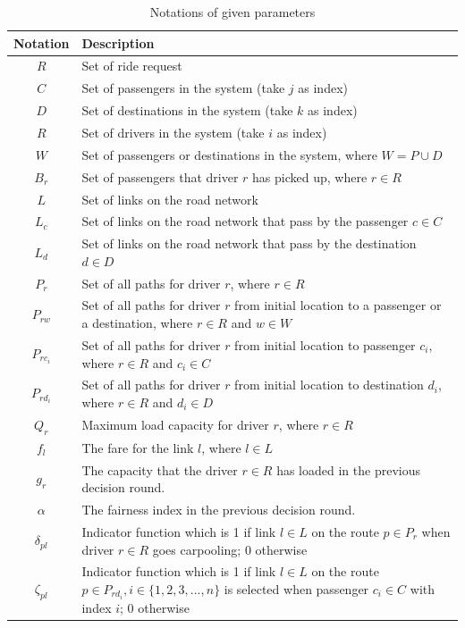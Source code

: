 \renewcommand\arraystretch{1.5}
\par
\begin{table}[ht]
  \centering
  \caption{Notations of given parameters}
  \begin{tabularx}{\textwidth}{cX}
  \toprule
  Notation & Description \\
  \midrule
    $R$ & Set of ride request \\
    $C$ & Set of passengers in the system (take $j$ as index) \\
    $D$ & Set of destinations in the system (take $k$ as index) \\
    $R$ & Set of drivers in the system (take $i$ as index) \\
    $W$ & Set of passengers or destinations in the system, where $W = P \cup D$ \\
    $B_r$ & Set of passengers that driver $r$ has picked up, where $r \in R$ \\
    $L$ & Set of links on the road network \\
    $L_c$ & Set of links on the road network that pass by the passenger $c \in C$ \\
    $L_d$ & Set of links on the road network that pass by the destination $d \in D$ \\
    $P_r$ & Set of all paths for driver $r$, where $r \in R$ \\
    $P_{rw}$ & Set of all paths for driver $r$ from initial location to a passenger or a destination, where $r \in R$ and $w \in W$ \\
    $P_{rc_i}$ & Set of all paths for driver $r$ from initial location to passenger $c_i$, where $r \in R$ and $c_i \in C$ \\
    $P_{rd_i}$ & Set of all paths for driver $r$ from initial location to destination $d_i$, where $r \in R$ and $d_i \in D$ \\
    $Q_r$ & Maximum load capacity for driver $r$, where $r \in R$ \\
    $f_l$ & The fare for the link $l$, where $l \in L$ \\
    $g_r$ & The capacity that the driver $r \in R$ has loaded in the previous decision round. \\
    $\alpha$ & The fairness index in the previous decision round. \\
    $\delta_{pl}$ & Indicator function which is 1 if link $l \in L$ on the route $p \in P_r$ when driver $r \in R$ goes carpooling; 0 otherwise \\
    $\zeta_{pl}$ & Indicator function which is 1 if link $l \in L$ on the route $p \in P_{rd_i}, i \in \{1,2,3,...,n\}$ is selected when passenger $c_i \in C$ with index $i$; 0 otherwise \\
  \bottomrule
  \end{tabularx}
\end{table}  
\par

